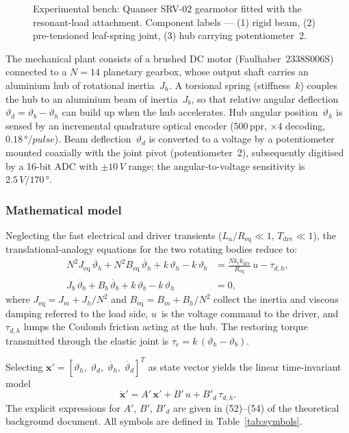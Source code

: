 \documentclass[11pt]{article}
\DeclareRobustCommand{\vect}[1]{ \boldsymbol{#1} }
\newcommand{\thh}{\vartheta_h}
\newcommand{\thb}{\vartheta_b}
\newcommand{\thd}{\vartheta_d}
\newcommand{\Jeq}{J_\mathrm{eq}}
\newcommand{\Beq}{B_\mathrm{eq}}
\begin{document}
\begin{figure}[H]
    \centering
    \caption{Experimental bench: Quanser SRV-02 gearmotor fitted with the resonant-load
             attachment. Component labels --- (1) rigid beam, (2) pre-tensioned leaf-spring
             joint, (3) hub carrying potentiometer~2.}
    \label{fig:setup}
\end{figure}

The mechanical plant consists of a brushed DC motor (Faulhaber~2338S006S) connected to a
$N{=}14$ planetary gearbox, whose output shaft carries an aluminium hub of rotational
inertia~$J_h$.  A torsional spring (stiffness~$k$) couples the hub to an aluminium beam of
inertia~$J_b$, so that relative angular deflection $\thd = \thb - \thh$ can build up when
the hub accelerates.  Hub angular position~$\thh$ is sensed by an incremental quadrature
optical encoder ($500\,\text{ppr}$, ${\times}4$ decoding, $0.18\,\si{\degree/pulse}$).
Beam deflection~$\thd$ is converted to a voltage by a potentiometer mounted coaxially with
the joint pivot (potentiometer~2), subsequently digitised by a 16-bit ADC with
${\pm}10\,\si{V}$ range; the angular-to-voltage sensitivity is
$2.5\,\si{V}/170\,\si{\degree}$.

\subsubsection*{Mathematical model}

Neglecting the fast electrical and driver transients
($L_a/R_\mathrm{eq} \ll 1$, $T_\mathrm{drv} \ll 1$),
the translational-analogy equations for the two rotating bodies reduce to:
\begin{align}
    N^2 \Jeq\,\ddot{\thh} + N^2 \Beq\,\dot{\thh} + k\,\thh - k\,\thb
        &= \frac{N k_t k_\mathrm{drv}}{R_\mathrm{eq}}\,u - \tau_{d,h},
        \label{eq:hub}\\
    J_b\,\ddot{\thb} + B_b\,\dot{\thb} + k\,\thb - k\,\thh &= 0,
    \label{eq:beam}
\end{align}
where $\Jeq = J_m + J_h/N^2$ and $\Beq = B_m + B_h/N^2$ collect the inertia and viscous
damping referred to the load side, $u$~is the voltage command to the driver, and
$\tau_{d,h}$ lumps the Coulomb friction acting at the hub.  The restoring torque transmitted
through the elastic joint is $\tau_e = k\,(\thh - \thb)$.

Selecting $\vect{x}' = [\thh,\;\thd,\;\dot{\thh},\;\dot{\thd}]^T$ as state vector yields
the linear time-invariant model
\begin{equation}
    \dot{\vect{x}}' = A'\,\vect{x}' + B'\,u + B'_d\,\tau_{d,h}.
    \label{eq:ss}
\end{equation}
The explicit expressions for $A'$, $B'$, $B'_d$ are given in (52)--(54) of the theoretical
background document.  All symbols are defined in Table~\ref{tab:symbols}.
\end{document}
